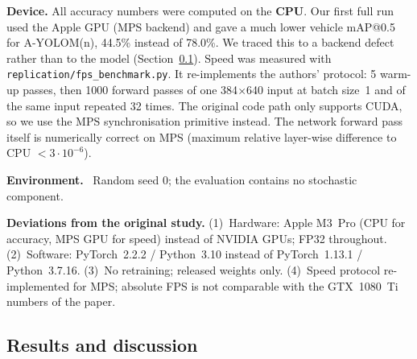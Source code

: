 \documentclass[journal,onecolumn]{IEEEtran}
\begin{document}
\textbf{Device.} All accuracy numbers were computed on the \textbf{CPU}. Our first full run used the Apple GPU (MPS backend) and gave a much lower vehicle mAP@0.5 for A-YOLOM(n), 44.5\% instead of 78.0\%. We traced this to a backend defect rather than to the model (Section~\ref{sec:replres}). Speed was measured with \texttt{replication/fps\_benchmark.py}. It re-implements the authors' protocol: 5 warm-up passes, then 1000 forward passes of one 384$\times$640 input at batch size~1 and of the same input repeated 32 times. The original code path only supports CUDA, so we use the MPS synchronisation primitive instead. The network forward pass itself is numerically correct on MPS (maximum relative layer-wise difference to CPU $<3\cdot10^{-6}$).

\textbf{Environment.} \ReplEnvironment\ Random seed 0; the evaluation contains no stochastic component.

\textbf{Deviations from the original study.} (1)~Hardware: Apple M3~Pro (CPU for accuracy, MPS GPU for speed) instead of NVIDIA GPUs; FP32 throughout. (2)~Software: PyTorch~2.2.2 / Python~3.10 instead of PyTorch~1.13.1 / Python~3.7.16. (3)~No retraining; released weights only. (4)~Speed protocol re-implemented for MPS; absolute FPS is not comparable with the GTX~1080~Ti numbers of the paper.

\subsection{Results and discussion}\label{sec:replres}


\ReplDiscussion

\end{document}

